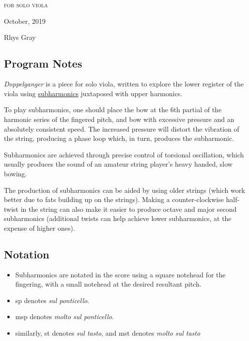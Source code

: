 
\chapter[\violaPiece]{}

\vspace*{3cm}
\begin{center}
\textsc{for solo viola}

\vspace*{3.5cm}

\HRule{0.5pt}


\LARGE \textbf{\uppercase{\violaPiece}}
\HRule{2pt}

\vspace{1.3cm}

\normalsize October, 2019
\date{}

\vspace*{5\baselineskip}

Rhys Gray

\end{center}
\newpage
\newpage

\section*{Program Notes}
\emph{Doppelganger} is a piece for solo viola, written to explore the lower register of the viola using \hyperref[sec:subharmonics]{subharmonics} juxtaposed with upper harmonics. 

To play subharmonics, one should place the bow at the 6th partial of the harmonic series of the fingered pitch, and bow with excessive pressure and an absolutely consistent speed. 
The increased pressure will distort the vibration of the string, producing a phase loop which, in turn, produces the subharmonic. 

Subharmonics are achieved through precise control of torsional oscillation, which usually produces the sound of an amateur string player's heavy handed, slow bowing. 

The production of subharmonics can be aided by using older strings (which work better due to fats building up on the strings). 
Making a counter-clockwise half-twist in the string can also make it easier to produce octave and major second subharmonics (additional twists can help achieve lower subharmonics, at the expense of higher ones).

\section*{Notation}
\begin{itemize}

    \item Subharmonics are notated in the score using a square notehead for the fingering, with a small notehead at the desired resultant pitch.
    \item sp denotes \emph{sul ponticello}.
    \item msp denotes \emph{molto sul ponticello}.
    \item similarly, st denotes \emph{sul tasto}, and mst denotes \emph{molto sul tasto}
\end{itemize}

\newpage\label{app:violaPiece Score}

% 
